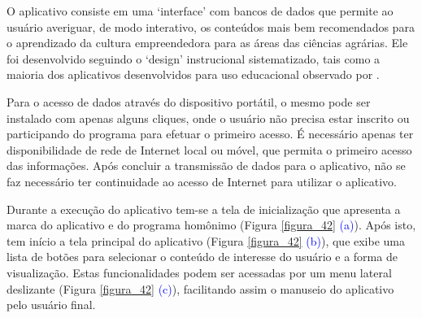 O aplicativo consiste em uma ‘interface’ com bancos de dados que permite ao usuário averiguar, de modo interativo, os conteúdos mais bem recomendados para o aprendizado da cultura empreendedora para as áreas das ciências agrárias. Ele foi desenvolvido seguindo o ‘design’ instrucional sistematizado, tais como a maioria dos aplicativos desenvolvidos para uso educacional observado por .

Para o acesso de dados através do dispositivo portátil, o mesmo pode ser instalado com apenas alguns cliques, onde o usuário não precisa estar inscrito ou participando do programa para efetuar o primeiro acesso. É necessário apenas ter disponibilidade de rede de Internet local ou móvel, que permita o primeiro acesso das informações. Após concluir a transmissão de dados para o aplicativo, não se faz necessário ter continuidade ao acesso de Internet para utilizar o aplicativo.


Durante a execução do aplicativo tem-se a tela de inicialização que apresenta a marca do aplicativo e do programa homônimo (Figura \ref{figura_42} \textcolor{blue}{(a)}). Após isto, tem início a tela principal do aplicativo (Figura \ref{figura_42} \textcolor{blue}{(b)}), que exibe uma lista de botões para selecionar o conteúdo de interesse do usuário e a forma de visualização. Estas funcionalidades podem ser acessadas por um menu lateral deslizante (Figura \ref{figura_42} \textcolor{blue}{(c)}), facilitando assim o manuseio do aplicativo pelo usuário final. 



